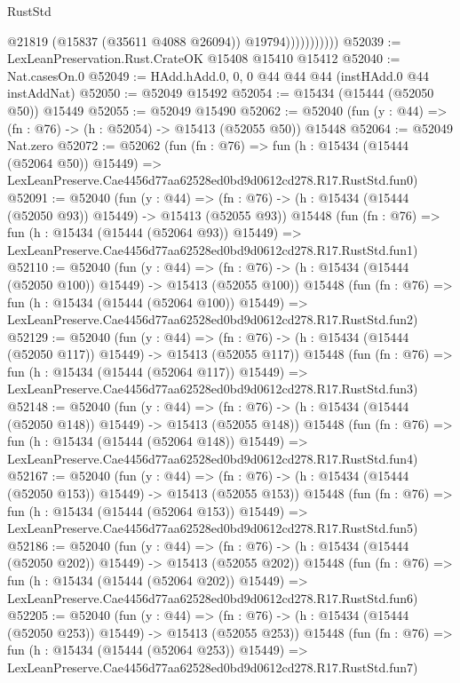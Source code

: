 \begin{lexlean}{RustStd}
\begin{coremodule}
                          @21819
                          (@15837 (@35611 @4088 @26094))
                          @19794)))))))))))
@52039 := LexLeanPreservation.Rust.CrateOK @15408 @15410 @15412
@52040 := Nat.casesOn.{0}
@52049 := HAdd.hAdd.{0, 0, 0} @44 @44 @44 (instHAdd.{0} @44 instAddNat)
@52050 := @52049 @15492
@52054 := @15434 (@15444 (@52050 @50)) @15449
@52055 := @52049 @15490
@52062 := @52040 (fun (y : @44) => (fn : @76) -> (h : @52054) -> @15413 (@52055 @50)) @15448
@52064 := @52049 Nat.zero
@52072 := @52062
    (fun (fn : @76) =>
    fun (h : @15434 (@15444 (@52064 @50)) @15449) =>
    LexLeanPreserve.Cae4456d77aa62528ed0bd9d0612cd278.R17.RustStd.fun0)
@52091 := @52040
    (fun (y : @44) =>
    (fn : @76) -> (h : @15434 (@15444 (@52050 @93)) @15449) -> @15413 (@52055 @93))
    @15448
    (fun (fn : @76) =>
    fun (h : @15434 (@15444 (@52064 @93)) @15449) =>
    LexLeanPreserve.Cae4456d77aa62528ed0bd9d0612cd278.R17.RustStd.fun1)
@52110 := @52040
    (fun (y : @44) =>
    (fn : @76) -> (h : @15434 (@15444 (@52050 @100)) @15449) -> @15413 (@52055 @100))
    @15448
    (fun (fn : @76) =>
    fun (h : @15434 (@15444 (@52064 @100)) @15449) =>
    LexLeanPreserve.Cae4456d77aa62528ed0bd9d0612cd278.R17.RustStd.fun2)
@52129 := @52040
    (fun (y : @44) =>
    (fn : @76) -> (h : @15434 (@15444 (@52050 @117)) @15449) -> @15413 (@52055 @117))
    @15448
    (fun (fn : @76) =>
    fun (h : @15434 (@15444 (@52064 @117)) @15449) =>
    LexLeanPreserve.Cae4456d77aa62528ed0bd9d0612cd278.R17.RustStd.fun3)
@52148 := @52040
    (fun (y : @44) =>
    (fn : @76) -> (h : @15434 (@15444 (@52050 @148)) @15449) -> @15413 (@52055 @148))
    @15448
    (fun (fn : @76) =>
    fun (h : @15434 (@15444 (@52064 @148)) @15449) =>
    LexLeanPreserve.Cae4456d77aa62528ed0bd9d0612cd278.R17.RustStd.fun4)
@52167 := @52040
    (fun (y : @44) =>
    (fn : @76) -> (h : @15434 (@15444 (@52050 @153)) @15449) -> @15413 (@52055 @153))
    @15448
    (fun (fn : @76) =>
    fun (h : @15434 (@15444 (@52064 @153)) @15449) =>
    LexLeanPreserve.Cae4456d77aa62528ed0bd9d0612cd278.R17.RustStd.fun5)
@52186 := @52040
    (fun (y : @44) =>
    (fn : @76) -> (h : @15434 (@15444 (@52050 @202)) @15449) -> @15413 (@52055 @202))
    @15448
    (fun (fn : @76) =>
    fun (h : @15434 (@15444 (@52064 @202)) @15449) =>
    LexLeanPreserve.Cae4456d77aa62528ed0bd9d0612cd278.R17.RustStd.fun6)
@52205 := @52040
    (fun (y : @44) =>
    (fn : @76) -> (h : @15434 (@15444 (@52050 @253)) @15449) -> @15413 (@52055 @253))
    @15448
    (fun (fn : @76) =>
    fun (h : @15434 (@15444 (@52064 @253)) @15449) =>
    LexLeanPreserve.Cae4456d77aa62528ed0bd9d0612cd278.R17.RustStd.fun7)

\end{coremodule}
\end{lexlean}
